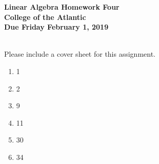 \documentclass[11pt]{article}
\begin{document}
\pagestyle{empty}
 
\begin{center}
{\Large {\bf Linear Algebra Homework Four}}\\
\medskip
{\large {\bf College of the Atlantic}}\\
\medskip
{\large {\bf Due Friday February 1, 2019}}\\
\medskip
\end{center}

\\


\noindent Please include a cover sheet for this assignment.\\

\begin{enumerate}
\setlength{\itemsep}{-1mm}
\item 1
\item 2
\item 9
\item 11
\item 30
\item 34
\end{enumerate}
\end{document}
